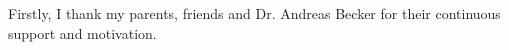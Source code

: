 \begin{acknowledgements}
Firstly, I thank my parents, friends and Dr. Andreas Becker for their continuous support and motivation.
\end{acknowledgements}